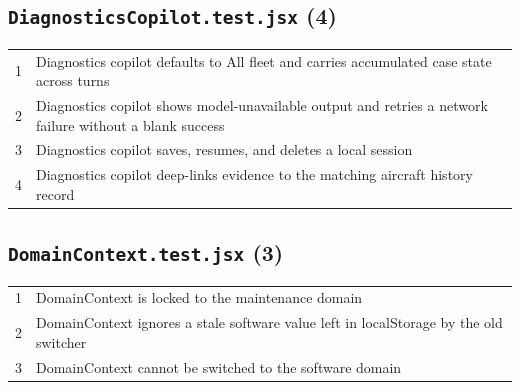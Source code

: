 \subsection*{\texttt{DiagnosticsCopilot.test.jsx} (4)}
\begin{longtable}{p{}p{}}
1 & Diagnostics copilot defaults to All fleet and carries accumulated case state across turns \\
2 & Diagnostics copilot shows model-unavailable output and retries a network failure without a blank success \\
3 & Diagnostics copilot saves, resumes, and deletes a local session \\
4 & Diagnostics copilot deep-links evidence to the matching aircraft history record \\
\end{longtable}
\subsection*{\texttt{DomainContext.test.jsx} (3)}
\begin{longtable}{p{}p{}}
1 & DomainContext is locked to the maintenance domain \\
2 & DomainContext ignores a stale software value left in localStorage by the old switcher \\
3 & DomainContext cannot be switched to the software domain \\
\end{longtable}
